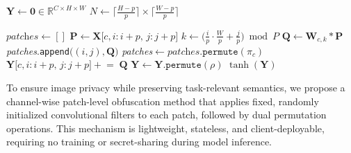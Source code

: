 \documentclass{ieeeaccess}
\begin{document}
\begin{algorithm}[t]
\caption{Channel-wise Patch-level Obfuscation with Conv2D and Dual Permutations}
\label{alg:obfuscator}
\begin{algorithmic}[1]
  

\STATE $\mathbf{Y}\gets\mathbf{0}\in\mathbb{R}^{C \times H \times W}$
\STATE $N \gets \bigl\lceil\frac{H-p}{p}\bigr\rceil \times \bigl\lceil\frac{W-p}{p}\bigr\rceil$ 

    \STATE $\textit{patches} \gets []$
            \STATE $\mathbf{P}\!\leftarrow\!\mathbf{X}\bigl[c,i{:}i{+}p,\,j{:}j{+}p\bigr]$
            \STATE $k \gets \bigl(\tfrac{i}{p}\cdot\tfrac{W}{p}+\tfrac{j}{p}\bigr)\bmod P$  
            \STATE $\mathbf{Q}\!\leftarrow\!\mathbf{W}_{c,k}\ast\mathbf{P}$
            \STATE \textit{patches}.\texttt{append}$\bigl((i,j),\mathbf{Q}\bigr)$
        \ENDFOR
    \ENDFOR
    \STATE \textit{patches}$\leftarrow \textit{patches}.\texttt{permute}(\pi_c)$                
        \STATE $\mathbf{Y}\bigl[c,i{:}i{+}p,\,j{:}j{+}p\bigr] \mathrel{+}{=}\; \mathbf{Q}$
    \ENDFOR
\ENDFOR
\STATE $\mathbf{Y}\gets \mathbf{Y}.\texttt{permute}(\rho)$
\STATE \Return $\tanh(\mathbf{Y})$
\end{algorithmic}
\end{algorithm}

To ensure image privacy while preserving task-relevant semantics, we propose a channel-wise patch-level obfuscation method that applies fixed, randomly initialized convolutional filters to each patch, followed by dual permutation operations. This mechanism is lightweight, stateless, and client-deployable, requiring no training or secret-sharing during model inference.
\end{document}
